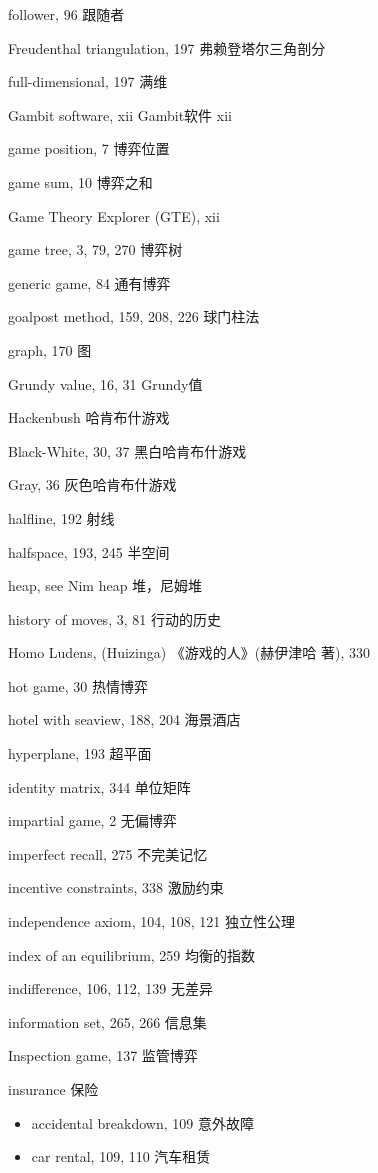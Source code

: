 follower, 96 跟随者

Freudenthal triangulation, 197 弗赖登塔尔三角剖分

full-dimensional, 197 满维

Gambit software, xii Gambit软件 xii

game position, 7 博弈位置

game sum, 10 博弈之和

Game Theory Explorer (GTE), xii

game tree, 3, 79, 270 博弈树

generic game, 84 {\color{blue} 通有博弈}

goalpost method, 159, 208, 226 {\color{blue}  球门柱法 }

graph, 170 图

Grundy value, 16, 31 Grundy值

Hackenbush 哈肯布什游戏

\qquad  Black-White, 30, 37 黑白哈肯布什游戏

\qquad  Gray, 36 灰色哈肯布什游戏

halfline, 192 {\color{blue} 射线}

halfspace, 193, 245 半空间

heap, see Nim heap 堆，尼姆堆 

history of moves, 3, 81 行动的历史


Homo Ludens, (Huizinga) 《游戏的人》(赫伊津哈 著), 330

hot game, 30  {\color{blue} 热情博弈 }

hotel with seaview, 188, 204 {\color{blue}  海景酒店 }

hyperplane, 193 超平面 

identity matrix, 344 单位矩阵 

impartial game, 2 无偏博弈  

imperfect recall, 275 不完美记忆  

incentive constraints, 338 激励约束 

independence axiom, 104, 108, 121 独立性公理

index of an equilibrium, 259 均衡的指数

indifference, 106, 112, 139 无差异 

information set, 265, 266 信息集 

Inspection game, 137 监管博弈 

insurance 保险 

\begin{itemize}
\item[]accidental breakdown, 109 意外故障 

\item[]car rental, 109, 110 汽车租赁 
\end{itemize}

